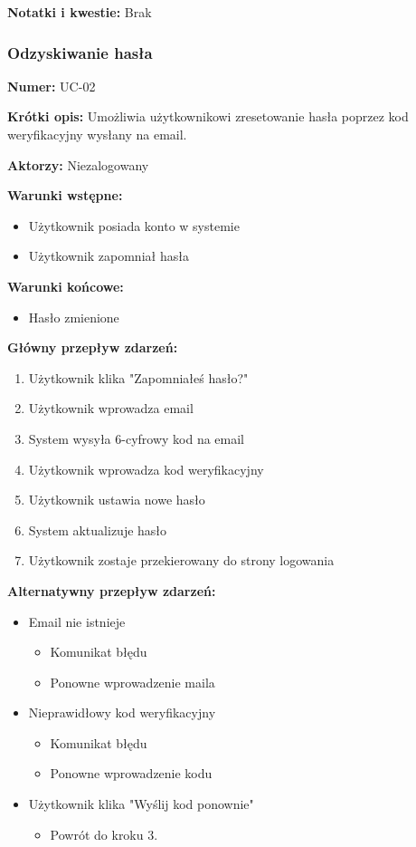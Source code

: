 \documentclass[12pt,a4paper]{article}
\begin{document}
\textbf{Notatki i kwestie:} Brak

\subsubsection{Odzyskiwanie hasła}

\textbf{Numer:} UC-02

\textbf{Krótki opis:} Umożliwia użytkownikowi zresetowanie hasła poprzez kod weryfikacyjny wysłany na email.

\textbf{Aktorzy:} Niezalogowany

\textbf{Warunki wstępne:}
\begin{itemize}[leftmargin=*]
    \item Użytkownik posiada konto w systemie
    \item Użytkownik zapomniał hasła
\end{itemize}

\textbf{Warunki końcowe:}
\begin{itemize}[leftmargin=*]
    \item Hasło zmienione
\end{itemize}

\textbf{Główny przepływ zdarzeń:}
\begin{enumerate}[leftmargin=*]
    \item Użytkownik klika "Zapomniałeś hasło?"
    \item Użytkownik wprowadza email
    \item System wysyła 6-cyfrowy kod na email
    \item Użytkownik wprowadza kod weryfikacyjny
    \item Użytkownik ustawia nowe hasło
    \item System aktualizuje hasło
    \item Użytkownik zostaje przekierowany do strony logowania
\end{enumerate}

\textbf{Alternatywny przepływ zdarzeń:}
\begin{itemize}[leftmargin=*]
    \item[2a] Email nie istnieje
    \begin{itemize}
        \item Komunikat błędu
        \item Ponowne wprowadzenie maila
    \end{itemize}
    \item[4a] Nieprawidłowy kod weryfikacyjny
    \begin{itemize}
        \item Komunikat błędu
        \item Ponowne wprowadzenie kodu
    \end{itemize}
    \item[4b] Użytkownik klika "Wyślij kod ponownie"
    \begin{itemize}
        \item Powrót do kroku 3.
    \end{itemize}
\end{itemize}
\end{document}
